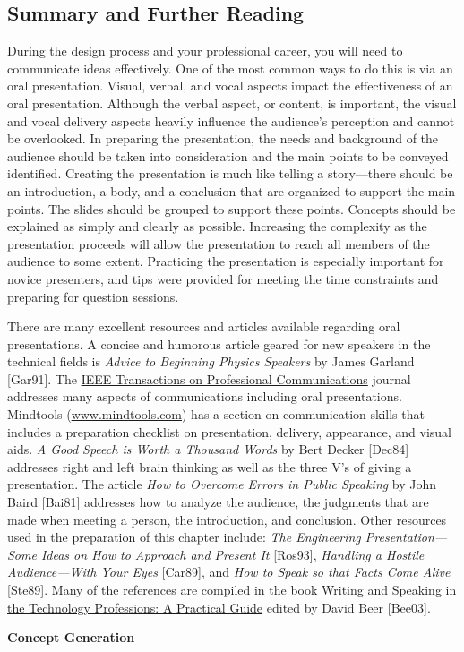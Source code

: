 \subsection{Summary and Further
Reading}\label{summary-and-further-reading}

During the design process and your professional career, you will need to
communicate ideas effectively. One of the most common ways to do this is
via an oral presentation. Visual, verbal, and vocal aspects impact the
effectiveness of an oral presentation. Although the verbal aspect, or
content, is important, the visual and vocal delivery aspects heavily
influence the audience's perception and cannot be overlooked. In
preparing the presentation, the needs and background of the audience
should be taken into consideration and the main points to be conveyed
identified. Creating the presentation is much like telling a
story---there should be an introduction, a body, and a conclusion that
are organized to support the main points. The slides should be grouped
to support these points. Concepts should be explained as simply and
clearly as possible. Increasing the complexity as the presentation
proceeds will allow the presentation to reach all members of the
audience to some extent. Practicing the presentation is especially
important for novice presenters, and tips were provided for meeting the
time constraints and preparing for question sessions.

There are many excellent resources and articles available regarding oral
presentations. A concise and humorous article geared for new speakers in
the technical fields is \emph{Advice to Beginning Physics Speakers} by
James Garland {[}Gar91{]}. The \ul{IEEE Transactions on Professional
Communications} journal addresses many aspects of communications
including oral presentations. Mindtools
(\href{http://www.mindtools.com}{www.mindtools.com}) has a section on
communication skills that includes a preparation checklist on
presentation, delivery, appearance, and visual aids. \emph{A Good Speech
is Worth a Thousand Words} by Bert Decker {[}Dec84{]} addresses right
and left brain thinking as well as the three V's of giving a
presentation. The article \emph{How to Overcome Errors in Public
Speaking} by John Baird {[}Bai81{]} addresses how to analyze the
audience, the judgments that are made when meeting a person, the
introduction, and conclusion. Other resources used in the preparation of
this chapter include: \emph{The Engineering Presentation---Some Ideas on
How to Approach and Present It} {[}Ros93{]}, \emph{Handling a Hostile
Audience---With Your Eyes} {[}Car89{]}, and \emph{How to Speak so that
Facts Come Alive} {[}Ste89{]}. Many of the references are compiled in
the book \ul{Writing and Speaking in the Technology Professions: A
Practical Guide} edited by David Beer {[}Bee03{]}.

\textbf{Concept Generation}
